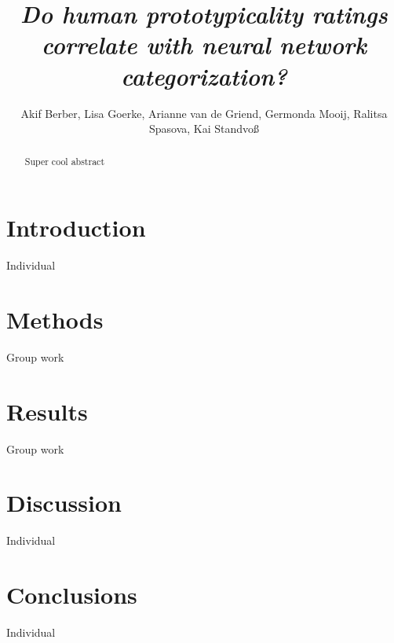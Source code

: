 \documentclass[10pt,a4paper,twocolumn]{article}
\begin{document}
\title{\textit{Do human prototypicality ratings correlate with neural network categorization?}}
\author{Akif Berber, Lisa Goerke, Arianne van de Griend, Germonda Mooij, Ralitsa Spasova, Kai Standvoß}


\maketitle
\thispagestyle{fancy}

\begin{abstract}

Super cool abstract

\end{abstract}

\section*{Introduction}
Individual

\section*{Methods}
Group work

\section*{Results}
Group work

\section*{Discussion}
Individual

\section*{Conclusions}
Individual

{\small
}
\end{document}
